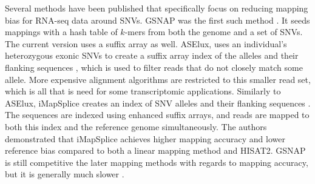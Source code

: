 Several methods have been published that specifically focus on reducing mapping bias for RNA-seq data around SNVs. 
GSNAP was the first such method \cite{Wu2010-hv}.
It seeds mappings with a hash table of $k$-mers from both the genome and a set of SNVs.
The current version uses a suffix array as well. 
ASElux, uses an individual's heterozygous exonic SNVs to create a suffix array index of the alleles and their flanking sequences \cite{Miao2018-ps}, which is used to filter reads that do not closely match some allele.
More expensive alignment algorithms are restricted to this smaller read set, which is all that is need for some transcriptomic applications.
Similarly to ASElux, iMapSplice creates an index of SNV alleles and their flanking sequences \cite{Liu_2018}.
The sequences are indexed using enhanced suffix arrays, and reads are mapped to both this index and the reference genome simultaneously.
The authors demonstrated that iMapSplice achieves higher mapping accuracy and lower reference bias compared to both a linear mapping method and HISAT2.
GSNAP is still competitive the later mapping methods with regards to mapping accuracy, but it is generally much slower \cite{Castel2015-ef}.



